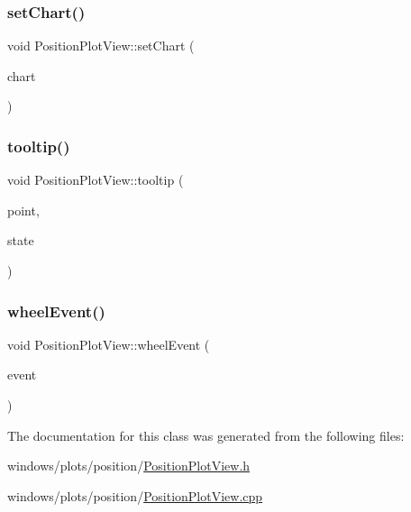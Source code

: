 \mbox{\label{class_position_plot_view_a15a049e5297a4310341fc8f82a931109}} 
\subsubsection{\texorpdfstring{set\+Chart()}{setChart()}}
{\footnotesize\ttfamily void Position\+Plot\+View\+::set\+Chart (\begin{DoxyParamCaption}\item[{\hyperlink{class_position_plot}{Position\+Plot} $\ast$}]{chart }\end{DoxyParamCaption})}

\mbox{\label{class_position_plot_view_a36123411a3dfa766d8ff34df1f11482e}} 
\subsubsection{\texorpdfstring{tooltip()}{tooltip()}}
{\footnotesize\ttfamily void Position\+Plot\+View\+::tooltip (\begin{DoxyParamCaption}\item[{Q\+PointF}]{point,  }\item[{bool}]{state }\end{DoxyParamCaption})}

\mbox{\label{class_position_plot_view_a0f4f8d0d4ec6c7eaebb8308ea9206c69}} 
\subsubsection{\texorpdfstring{wheel\+Event()}{wheelEvent()}}
{\footnotesize\ttfamily void Position\+Plot\+View\+::wheel\+Event (\begin{DoxyParamCaption}\item[{Q\+Wheel\+Event $\ast$}]{event }\end{DoxyParamCaption})}



The documentation for this class was generated from the following files\+:\begin{DoxyCompactItemize}
\item 
windows/plots/position/\hyperlink{_position_plot_view_8h}{Position\+Plot\+View.\+h}\item 
windows/plots/position/\hyperlink{_position_plot_view_8cpp}{Position\+Plot\+View.\+cpp}\end{DoxyCompactItemize}
